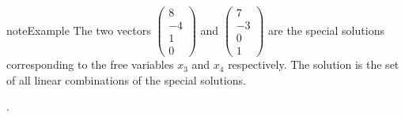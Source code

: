 \documentclass[letterpaper,10pt,english]{jupyterBook}
\begin{document}
\begin{sphinxadmonition}{note}{Example}
\sphinxAtStartPar
The two vectors \(\begin{pmatrix}8 \\-4\\ 1 \\ 0\end{pmatrix}\) and \(\begin{pmatrix}7 \\ -3 \\ 0\\1\end{pmatrix}\) are the special solutions corresponding to the free variables \(x_3\) and \(x_4\) respectively. The solution is the set of all linear combinations of the special solutions.

\sphinxAtStartPar
{}.
\end{sphinxadmonition}
\end{document}
